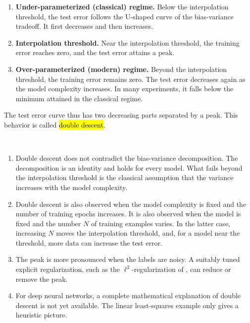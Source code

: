 \begin{enumerate}
\item \textbf{Under-parameterized (classical) regime.} Below the interpolation threshold, the test error follows the U-shaped curve of the bias-variance tradeoff. It first decreases and then increases.
\item \textbf{Interpolation threshold.} Near the interpolation threshold, the training error reaches zero, and the test error attains a peak.
\item \textbf{Over-parameterized (modern) regime.} Beyond the interpolation threshold, the training error remains zero. The test error decreases again as the model complexity increases. In many experiments, it falls below the minimum attained in the classical regime.
\end{enumerate}
The test error curve thus has two decreasing parts separated by a peak. This behavior is called \hl{double descent}.
\begin{remark}\label{double.descent.rem}
$~$
\begin{enumerate}
\item Double descent does not contradict the bias-variance decomposition. The decomposition is an identity and holds for every model. What fails beyond the interpolation threshold is the classical assumption that the variance increases with the model complexity.\medskip
\item Double descent is also observed when the model complexity is fixed and the number of training epochs increases. It is also observed when the model is fixed and the number $N$ of training examples varies. In the latter case, increasing $N$ moves the interpolation threshold, and, for a model near the threshold, more data can increase the test error.\medskip
\item The peak is more pronounced when the labels are noisy. A suitably tuned explicit regularization, such as the $\ell^2$-regularization of , can reduce or remove the peak.\medskip
\item For deep neural networks, a complete mathematical explanation of double descent is not yet available. The linear least-squares example only gives a heuristic picture.
\end{enumerate}
\end{remark}


